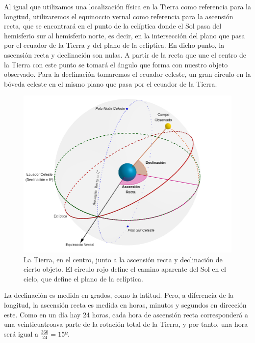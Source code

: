 \documentclass[11pt]{book}
\begin{document}
Al igual que utilizamos una localización física en la Tierra como referencia para la longitud, utilizaremos el equinoccio vernal como referencia para la ascensión recta, que se encontrará en el punto de la eclíptica donde el Sol pasa del hemisferio sur al hemisferio norte, es decir, en la intersección del plano que pasa por el ecuador de la Tierra y del plano de la eclíptica. En dicho punto, la ascensión recta y declinación son nulas. A partir de la recta que une el centro de la Tierra con este punto se tomará el ángulo que forma con nuestro objeto observado. Para la declinación tomaremos el ecuador celeste, un gran círculo en la bóveda celeste en el mismo plano que pasa por el ecuador de la Tierra\cite{right_ascension_declination}.\\

\begin{figure}[H]
\centering
\includegraphics[scale=0.4]{images/ascension_declinacion.png}
\caption{La Tierra, en el centro, junto a la ascensión recta y declinación de cierto objeto. El círculo rojo define el camino aparente del Sol en el cielo, que define el plano de la eclíptica.}
\label{fig:ascension_declinacion}
\end{figure}

La declinación es medida en grados, como la latitud. Pero, a diferencia de la longitud, la ascensión recta es medida en horas, minutos y segundos en dirección este. Como en un día hay 24 horas, cada hora de ascensión recta corresponderá a una veinticuatroava parte de la rotación total de la Tierra, y por tanto, una hora será igual a $\frac{360}{24}=15º$.\\
\end{document}
